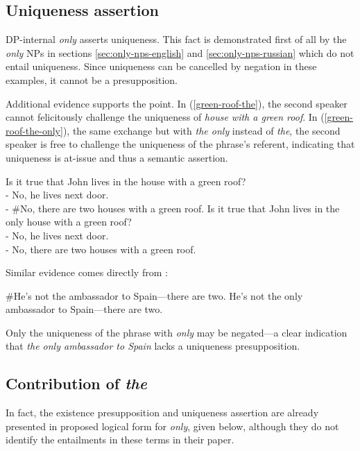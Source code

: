 \subsection{Uniqueness assertion}
DP-internal \textit{only} asserts uniqueness. This fact is demonstrated first of all by the \textit{only} NPs in sections \ref{sec:only-nps-english} and \ref{sec:only-nps-russian} which do not entail uniqueness. Since uniqueness can be cancelled by negation in these examples, it cannot be a presupposition.

Additional evidence supports the point. In (\ref{green-roof-the}), the second speaker cannot felicitously challenge the uniqueness of \textit{house with a green roof}. In (\ref{green-roof-the-only}), the same exchange but with \textit{the only} instead of \textit{the}, the second speaker is free to challenge the uniqueness of the phrase's referent, indicating that uniqueness is at-issue and thus a semantic assertion.

\begin{exe}
	\ex \label{green-roof-the} Is it true that John lives in the house with a green roof? \\
	    - No, he lives next door. \\
	    - \#No, there are two houses with a green roof.
	\ex \label{green-roof-the-only} Is it true that John lives in the only house with a green roof? \\
	    - No, he lives next door. \\
	    - No, there are two houses with a green roof.
\end{exe}

Similar evidence comes directly from \citet{cb2015}:

\begin{exe}
	\ex \#He's not the ambassador to Spain---there are two.
	\ex He's not the only ambassador to Spain---there are two.
\end{exe}

Only the uniqueness of the phrase with \textit{only} may be negated---a clear indication that \textit{the only ambassador to Spain} lacks a uniqueness presupposition.

\subsection{Contribution of \textit{the}}
In fact, the existence presupposition and uniqueness assertion are already presented in  proposed logical form for \textit{only}, given below, although they do not identify the entailments in these terms in their paper.

